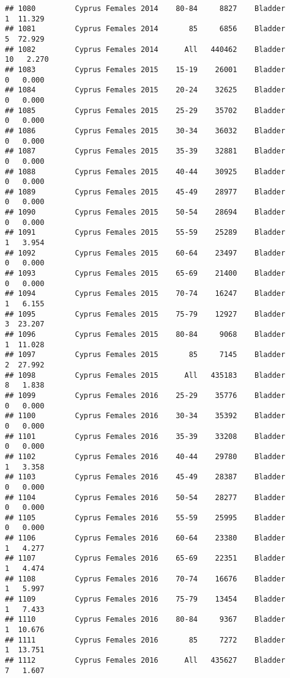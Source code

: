 \documentclass[
]{article}
\begin{document}
\begin{verbatim}
## 1080         Cyprus Females 2014    80-84     8827    Bladder      1  11.329
## 1081         Cyprus Females 2014       85     6856    Bladder      5  72.929
## 1082         Cyprus Females 2014      All   440462    Bladder     10   2.270
## 1083         Cyprus Females 2015    15-19    26001    Bladder      0   0.000
## 1084         Cyprus Females 2015    20-24    32625    Bladder      0   0.000
## 1085         Cyprus Females 2015    25-29    35702    Bladder      0   0.000
## 1086         Cyprus Females 2015    30-34    36032    Bladder      0   0.000
## 1087         Cyprus Females 2015    35-39    32881    Bladder      0   0.000
## 1088         Cyprus Females 2015    40-44    30925    Bladder      0   0.000
## 1089         Cyprus Females 2015    45-49    28977    Bladder      0   0.000
## 1090         Cyprus Females 2015    50-54    28694    Bladder      0   0.000
## 1091         Cyprus Females 2015    55-59    25289    Bladder      1   3.954
## 1092         Cyprus Females 2015    60-64    23497    Bladder      0   0.000
## 1093         Cyprus Females 2015    65-69    21400    Bladder      0   0.000
## 1094         Cyprus Females 2015    70-74    16247    Bladder      1   6.155
## 1095         Cyprus Females 2015    75-79    12927    Bladder      3  23.207
## 1096         Cyprus Females 2015    80-84     9068    Bladder      1  11.028
## 1097         Cyprus Females 2015       85     7145    Bladder      2  27.992
## 1098         Cyprus Females 2015      All   435183    Bladder      8   1.838
## 1099         Cyprus Females 2016    25-29    35776    Bladder      0   0.000
## 1100         Cyprus Females 2016    30-34    35392    Bladder      0   0.000
## 1101         Cyprus Females 2016    35-39    33208    Bladder      0   0.000
## 1102         Cyprus Females 2016    40-44    29780    Bladder      1   3.358
## 1103         Cyprus Females 2016    45-49    28387    Bladder      0   0.000
## 1104         Cyprus Females 2016    50-54    28277    Bladder      0   0.000
## 1105         Cyprus Females 2016    55-59    25995    Bladder      0   0.000
## 1106         Cyprus Females 2016    60-64    23380    Bladder      1   4.277
## 1107         Cyprus Females 2016    65-69    22351    Bladder      1   4.474
## 1108         Cyprus Females 2016    70-74    16676    Bladder      1   5.997
## 1109         Cyprus Females 2016    75-79    13454    Bladder      1   7.433
## 1110         Cyprus Females 2016    80-84     9367    Bladder      1  10.676
## 1111         Cyprus Females 2016       85     7272    Bladder      1  13.751
## 1112         Cyprus Females 2016      All   435627    Bladder      7   1.607

\end{verbatim}
\end{document}
